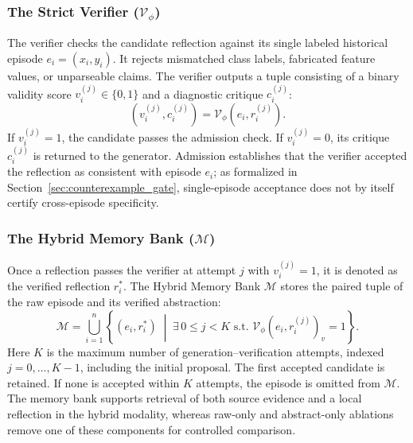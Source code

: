 \documentclass[10pt,a4paper,onecolumn]{article}
\theoremstyle{definition}
\theoremstyle{remark}
\begin{document}
\subsubsection{The Strict Verifier (\texorpdfstring{$\mathcal{V}_\phi$}{V\_phi})}
The verifier checks the candidate reflection against its single labeled historical episode $e_i=(x_i,y_i)$. It rejects mismatched class labels, fabricated feature values, or unparseable claims. The verifier outputs a tuple consisting of a binary validity score $v_i^{(j)} \in \{0, 1\}$ and a diagnostic critique $c_i^{(j)}$:
\begin{equation}
    (v_i^{(j)}, c_i^{(j)}) = \mathcal{V}_\phi(e_i, r_i^{(j)}).
    \label{eq:ver_basic}
\end{equation}
If $v_i^{(j)}=1$, the candidate passes the admission check. If $v_i^{(j)}=0$, its critique $c_i^{(j)}$ is returned to the generator. Admission establishes that the verifier accepted the reflection as consistent with episode $e_i$; as formalized in Section~\ref{sec:counterexample_gate}, single-episode acceptance does not by itself certify cross-episode specificity.

\subsubsection{The Hybrid Memory Bank (\texorpdfstring{$\mathcal{M}$}{M})}
Once a reflection passes the verifier at attempt $j$ with $v_i^{(j)} = 1$, it is denoted as the verified reflection $r_i^*$. The Hybrid Memory Bank $\mathcal{M}$ stores the paired tuple of the raw episode and its verified abstraction:
\begin{equation}
    \mathcal{M} = \bigcup_{i=1}^{n} \left\{ (e_i, r_i^*) \;\middle|\; \exists\,0\le j<K \text{ s.t. } \mathcal{V}_\phi(e_i, r_i^{(j)})_v = 1 \right\}.
    \label{eq:bank_union}
\end{equation}
Here $K$ is the maximum number of generation--verification attempts, indexed $j=0,\ldots,K-1$, including the initial proposal. The first accepted candidate is retained. If none is accepted within $K$ attempts, the episode is omitted from $\mathcal{M}$. The memory bank supports retrieval of both source evidence and a local reflection in the hybrid modality, whereas raw-only and abstract-only ablations remove one of these components for controlled comparison.
\end{document}
